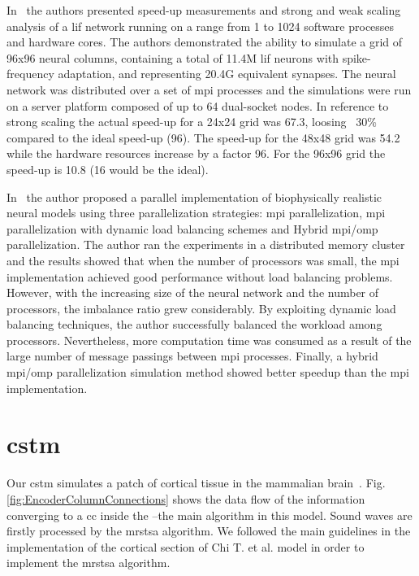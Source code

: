 \documentclass[10pt,journal,compsoc]{IEEEtran}
\begin{document}
In~\cite{Pastorelli2015ScalingT1} the authors presented speed-up measurements and strong and weak scaling analysis of a \gls{lif} network running on a range from 1 to 1024 software processes and hardware cores. The authors demonstrated the ability to simulate a grid of 96x96 neural columns, containing a total of 11.4M \gls{lif} neurons with spike-frequency adaptation, and representing 20.4G equivalent synapses. The neural network was distributed over a set of \gls{mpi} processes and the simulations were run on a server platform composed of up to 64 dual-socket nodes. In reference to strong scaling the actual speed-up for a 24x24 grid was 67.3, loosing ~30\% compared to the ideal speed-up (96). The speed-up for the 48x48 grid was 54.2 while the hardware resources increase by a factor 96. For the 96x96 grid the speed-up is 10.8 (16 would be the ideal).

In~\cite{hu2012biophysically} the author proposed a parallel implementation of biophysically realistic neural models using three parallelization strategies: \gls{mpi} parallelization, \gls{mpi} parallelization with dynamic load balancing schemes and Hybrid \gls{mpi}/\gls{omp} parallelization. The author ran the experiments in a distributed memory cluster and the results showed that when the number of processors was small, the \gls{mpi} implementation achieved good performance without load balancing problems. However, with the increasing size of the neural network and the number of processors, the imbalance ratio grew considerably. By exploiting dynamic load balancing techniques, the author successfully balanced the workload among processors. Nevertheless, more computation time was consumed as a result of the large number of message passings between \gls{mpi} processes. Finally, a hybrid \gls{mpi}/\gls{omp} parallelization simulation method showed better speedup than the \gls{mpi} implementation.

















\section{\gls{cstm}}

Our \gls{cstm} simulates a patch of cortical tissue in the mammalian brain~\cite{Dematties2018}. Fig. \ref{fig:EncoderColumnConnections} shows the data flow of the information converging to a \gls{cc} inside the --the main algorithm in this model. Sound waves are firstly processed by the \gls{mrstsa} algorithm. We followed the main guidelines in the implementation of the cortical section of Chi T. et al. \cite{chi_2005} model in order to implement the \gls{mrstsa} algorithm.
\end{document}
